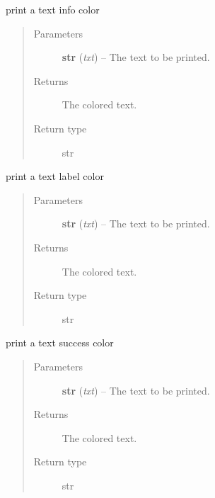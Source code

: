 \documentclass[a4paper,10pt,english]{sphinxmanual}
\begin{document}

\begin{fulllineitems}
\label{commands/apidoc/src:src.printcolors.printcInfo}
print a text info color
\begin{quote}\begin{description}
\item[{Parameters}] \leavevmode
\textbf{str} (\emph{txt}) -- The text to be printed.

\item[{Returns}] \leavevmode
The colored text.

\item[{Return type}] \leavevmode
str

\end{description}\end{quote}

\end{fulllineitems}


\begin{fulllineitems}
\label{commands/apidoc/src:src.printcolors.printcLabel}
print a text label color
\begin{quote}\begin{description}
\item[{Parameters}] \leavevmode
\textbf{str} (\emph{txt}) -- The text to be printed.

\item[{Returns}] \leavevmode
The colored text.

\item[{Return type}] \leavevmode
str

\end{description}\end{quote}

\end{fulllineitems}


\begin{fulllineitems}
\label{commands/apidoc/src:src.printcolors.printcSuccess}
print a text success color
\begin{quote}\begin{description}
\item[{Parameters}] \leavevmode
\textbf{str} (\emph{txt}) -- The text to be printed.

\item[{Returns}] \leavevmode
The colored text.

\item[{Return type}] \leavevmode
str

\end{description}\end{quote}

\end{fulllineitems}
\end{document}
